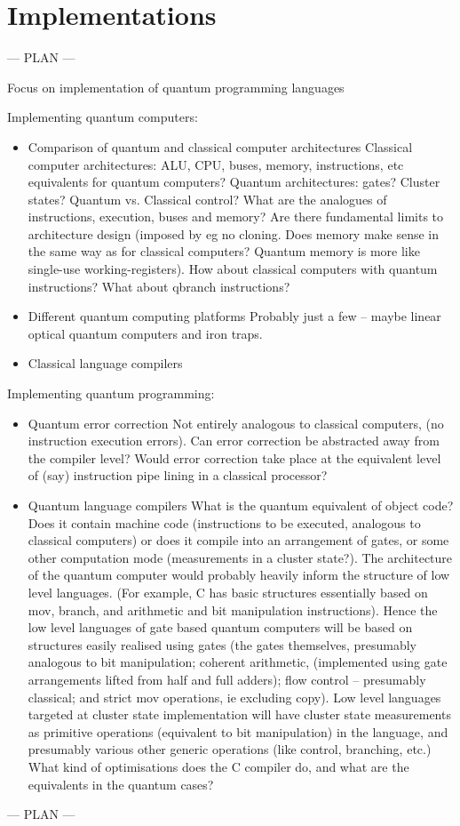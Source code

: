 \chapter{Implementations}\label{Implementations}

--- PLAN ---

Focus on implementation of quantum programming languages

Implementing quantum computers:
\begin{itemize}
\item Comparison of quantum and classical computer architectures
Classical computer architectures: ALU, CPU, buses, memory, instructions, etc equivalents for quantum computers? Quantum architectures: gates? Cluster states? Quantum vs. Classical control? What are the analogues of instructions, execution, buses and memory? Are there fundamental limits to architecture design (imposed by eg no cloning. Does memory make sense in the same way as for classical computers? Quantum memory is more like single-use working-registers). How about classical computers with quantum instructions? What about qbranch instructions?   
\item Different quantum computing platforms 
Probably just a few -- maybe linear optical quantum computers and iron traps. 
\item Classical language compilers
\end{itemize}
Implementing quantum programming:
\begin{itemize}
\item Quantum error correction
Not entirely analogous to classical computers, (no instruction execution errors). Can error correction be abstracted away from the compiler level? Would error correction take place at the equivalent level of (say) instruction pipe lining in a classical processor?    
\item Quantum language compilers
What is the quantum equivalent of object code? Does it contain machine code (instructions to be executed, analogous to classical computers) or does it compile into an arrangement of gates, or some other computation mode (measurements in a cluster state?). The architecture of the quantum computer would probably heavily inform the structure of low level languages. (For example, C has basic structures essentially based on mov, branch, and arithmetic and bit manipulation instructions). Hence the low level languages of gate based quantum computers will be based on structures easily realised using gates (the gates themselves, presumably analogous to bit manipulation; coherent arithmetic, (implemented using gate arrangements lifted from half and full adders); flow control -- presumably classical; and strict mov operations, ie excluding copy). Low level languages targeted at cluster state implementation will have cluster state measurements as primitive operations (equivalent to bit manipulation) in the language, and presumably various other generic operations (like control, branching, etc.) What kind of optimisations does the C compiler do, and what are the equivalents in the quantum cases? 
\end{itemize}
--- PLAN ---

